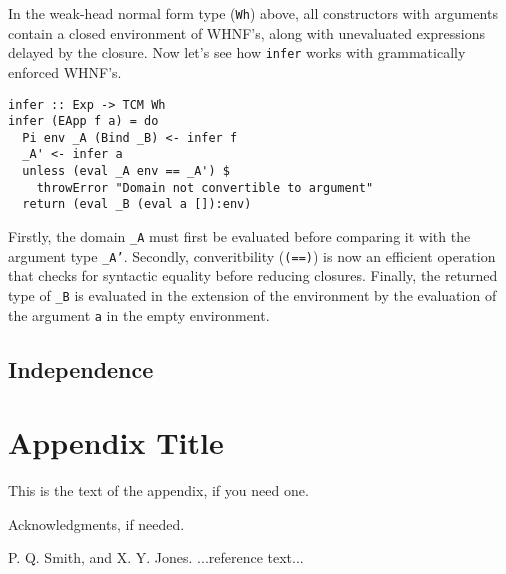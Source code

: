 \documentclass[preprint,authoryear]{sigplanconf}
\begin{document}
In the weak-head normal form type (\texttt{Wh}) above, all
constructors with arguments contain a closed environment of WHNF's,
along with unevaluated expressions delayed by the closure. 
Now let's see how \texttt{infer} works with grammatically enforced
WHNF's.

\begin{verbatim}
infer :: Exp -> TCM Wh
infer (EApp f a) = do
  Pi env _A (Bind _B) <- infer f
  _A' <- infer a
  unless (eval _A env == _A') $
    throwError "Domain not convertible to argument"
  return (eval _B (eval a []):env)
\end{verbatim}

Firstly, the domain \texttt{\_A} must first be evaluated before comparing it
with the argument type \texttt{\_A'}. Secondly, converitbility
(\texttt{(==)}) is now an efficient operation that checks for
syntactic equality before reducing closures. Finally, the returned
type of \texttt{\_B} is evaluated in the extension of the environment
by the evaluation of the argument \texttt{a} in the empty environment.




\subsection{Independence}

\appendix
\section{Appendix Title}

This is the text of the appendix, if you need one.

\acks

Acknowledgments, if needed.





\begin{thebibliography}{}
\softraggedright

P. Q. Smith, and X. Y. Jones. ...reference text...

\end{thebibliography}
\end{document}

